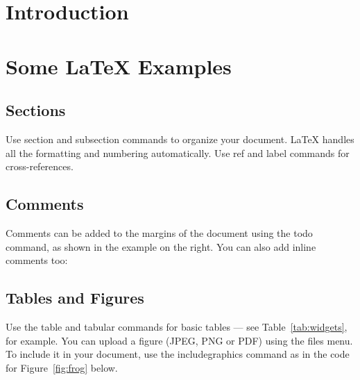 \documentclass[12pt]{article}
\begin{document}
\section{Introduction}
	

\section{Some \LaTeX{} Examples}
\label{sec:examples}

\subsection{Sections}

Use section and subsection commands to organize your document. \LaTeX{} handles all the formatting and numbering automatically. Use ref and label commands for cross-references.

\subsection{Comments}

Comments can be added to the margins of the document using the  todo command, as shown in the example on the right. You can also add inline comments too:


\subsection{Tables and Figures}

Use the table and tabular commands for basic tables --- see Table~\ref{tab:widgets}, for example. You can upload a figure (JPEG, PNG or PDF) using the files menu. To include it in your document, use the includegraphics command as in the code for Figure~\ref{fig:frog} below.

\end{document}
